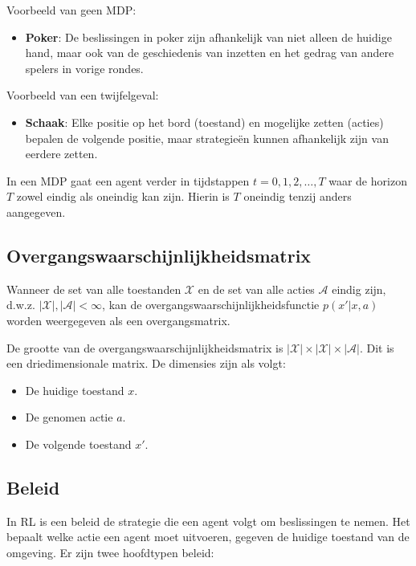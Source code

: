\documentclass[a4paper,12pt]{report}
\begin{document}
Voorbeeld van geen MDP:
\begin{itemize}
    \item \textbf{Poker}: De beslissingen in poker zijn afhankelijk van niet alleen de huidige hand, maar ook van de geschiedenis van inzetten en het gedrag van andere spelers in vorige rondes.
\end{itemize}

Voorbeeld van een twijfelgeval:
\begin{itemize}
    \item \textbf{Schaak}: Elke positie op het bord (toestand) en mogelijke zetten (acties) bepalen de volgende positie, maar strategieën kunnen afhankelijk zijn van eerdere zetten.
\end{itemize}

In een MDP gaat een agent verder in tijdstappen \(t = 0, 1, 2, \ldots, T\) waar
de horizon \(T\) zowel eindig als oneindig kan zijn. Hierin is \(T\) oneindig
tenzij anders aangegeven.

\subsection{Overgangswaarschijnlijkheidsmatrix}

Wanneer de set van alle toestanden \(\mathcal{X}\) en de set van alle acties
\(\mathcal{A}\) eindig zijn, d.w.z. \(|\mathcal{X}|, |\mathcal{A}| < \infty\),
kan de overgangswaarschijnlijkheidsfunctie \(p(x'|x,a)\) worden weergegeven als
een overgangsmatrix.

De grootte van de overgangswaarschijnlijkheidsmatrix is \(|\mathcal{X}| \times
|\mathcal{X}| \times |\mathcal{A}|\). Dit is een driedimensionale matrix. De
dimensies zijn als volgt:
\begin{itemize}
    \item De huidige toestand \(x\).
    \item De genomen actie \(a\).
    \item De volgende toestand \(x'\).
\end{itemize}

\subsection{Beleid}

In RL is een beleid de strategie die een agent volgt om beslissingen te nemen.
Het bepaalt welke actie een agent moet uitvoeren, gegeven de huidige toestand
van de omgeving. Er zijn twee hoofdtypen beleid:
\end{document}
